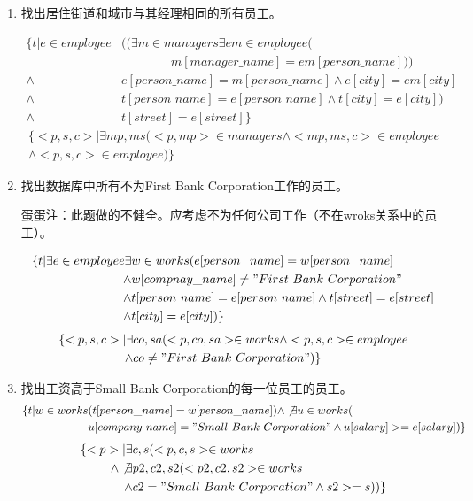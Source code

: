 \documentclass{dingjia}
\begin{document}
\begin{enumerate}
\begin{enumerate}
  \item 找出居住街道和城市与其经理相同的所有员工。

    \begin{align*}
      \{ t | e \in employee & ((\exists m \in managers \exists em \in employee( \\
                            & \qquad \qquad m[manager\_name] = em[person\_name])) \\
      \land & e[person\_name] = m[person\_name ] \land e[city] = em[city] \\
      \land & t[person\_name] = e[person\_name] \land t[city] = e[city]) \\
      \land & t[street] = e[street]\}
    \end{align*}
    \begin{align*}
      \{ <p,s,c> | \exists mp, ms(<p, mp> \in managers \land <mp,ms,c> \in employee \\
      \land <p, s, c> \in employee)\}
    \end{align*}

  \item 找出数据库中所有不为First Bank Corporation工作的员工。

    蛋蛋注：此题做的不健全。应考虑不为任何公司工作（不在wroks关系中的员工）。

    \begin{align*}
      \{t | \exists e \in employee \exists & w \in works(e[person\_name] = w[person\_name] \\
      \land & w[compnay\_name] \neq "First\ Bank\ Corporation" \\
      \land & t[person\ name] = e[person\ name] \land t[street] = e[street]\\
      \land & t[city] = e[city])\}
    \end{align*}
    \begin{align*}
      \{<p,s,c> | \exists & co,sa (<p, co, sa> \in works \land <p,s,c> \in employee \\
      \land & co \not = "First\ Bank\ Corporation") \}
    \end{align*}

  \item 找出工资高于Small Bank Corporation的每一位员工的员工。
    \begin{align*}
      \{t | w \in works & (t[person\_name] = w[person\_name]) \land \not \exists  u \in works( \\
                        & u[company\ name] = "Small\ Bank\ Corporation" \land u[salary] >= e[salary])\}
    \end{align*}
    \begin{align*}
      \{<p> | \exists & c,s (<p,c,s> \in works \\
      \land \not \exists & p2,c2,s2(<p2,c2,s2> \in works \\
      \land & c2 =  "Small\ Bank\ Corporation"  \land s2 >= s))\}
    \end{align*}


\end{enumerate}
\end{enumerate}
\end{document}
